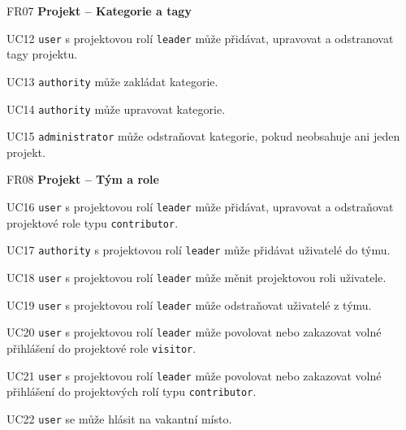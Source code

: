 \begin{dlnar}
   \item[FR07] \textbf{Projekt -- Kategorie a tagy}
 
   \begin{dlnar}
      \item[UC12]
      \texttt{user} s projektovou rolí \texttt{leader} může přidávat, upravovat a odstranovat tagy projektu. 

      \item[UC13]
      \texttt{authority} může zakládat kategorie. 

      \item[UC14]
      \texttt{authority} může upravovat kategorie. 

      \item[UC15]
      \texttt{administrator} může odstraňovat kategorie, pokud neobsahuje ani jeden projekt.
   \end{dlnar}
\end{dlnar}


\begin{dlnar}
   \item[FR08] \textbf{Projekt -- Tým a role}
 
   \begin{dlnar}

      \item[UC16] 
      \texttt{user} s projektovou rolí \texttt{leader} může přidávat, upravovat a odstraňovat projektové role typu \texttt{contributor}.

      \item[UC17]
      \texttt{authority} s projektovou rolí \texttt{leader} může přidávat uživatelé do týmu.

      \item[UC18] 
      \texttt{user} s projektovou rolí \texttt{leader} může měnit projektovou roli uživatele.

      \item[UC19]
      \texttt{user} s projektovou rolí \texttt{leader} může odstraňovat uživatelé z týmu.

      \item[UC20] 
      \texttt{user} s projektovou rolí \texttt{leader} může povolovat nebo zakazovat volné přihlášení do projektové role \texttt{visitor}.

      \item[UC21] 
      \texttt{user} s projektovou rolí \texttt{leader} může povolovat nebo zakazovat volné přihlášení do projektových rolí typu \texttt{contributor}.

      \item[UC22]
      \texttt{user} se může hlásit na vakantní místo.
   \end{dlnar}
\end{dlnar}


